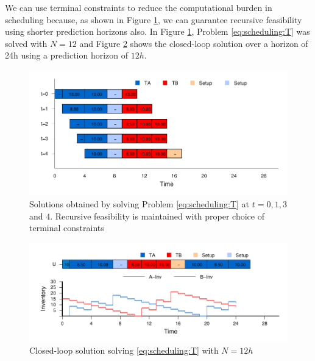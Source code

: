 We can use terminal constraints to reduce the computational burden in
scheduling because, as shown in Figure \ref{fig:scheduling:gantt_12},
we can guarantee recursive feasibility using shorter prediction
horizons also. In Figure
\ref{fig:scheduling:gantt_12}, Problem \eqref{eq:scheduling:T} was
solved with $N=12$ and Figure \ref{fig:scheduling:T_12_CL} shows the closed-loop
solution over a horizon of 24h using a prediction horizon of $12h$.

 
\begin{figure}
\begin{center}
\includegraphics{scheduling/gantt_12.pdf}
\caption[Recursive feasibility with terminal constraints for
$N=12h$]{Solutions obtained by solving Problem \eqref{eq:scheduling:T} 
at $t=0,1,3$ and $4$. Recursive feasibility is maintained with proper
choice of terminal constraints}
\label{fig:scheduling:gantt_12}
\end{center}
\end{figure}
\begin{figure}

\begin{center}
\includegraphics{scheduling/T_12_CL.pdf}
\caption{Closed-loop solution solving \eqref{eq:scheduling:T} with
  $N=12h$}
\label{fig:scheduling:T_12_CL}
\end{center}
\end{figure}

